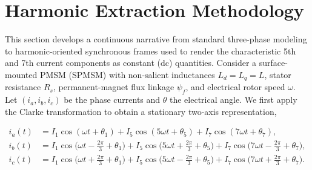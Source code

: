 \graphicspath{{./Chapters/CH5/Pictures/}}
\let\cleardoublepage\clearpage
\newcommand{\dfeq}[1]{\;\overset{\text{def}}{=}\;\label{eq:#1}}


\section{Harmonic Extraction Methodology}

This section develops a continuous narrative from standard three-phase modeling to harmonic-oriented synchronous frames used to render the characteristic 5th and 7th current components as constant (dc) quantities. Consider a surface-mounted PMSM (SPMSM) with non-salient inductances $L_d=L_q=L$, stator resistance $R_s$, permanent-magnet flux linkage $\psi_f$, and electrical rotor speed $\omega$. Let $(i_a,i_b,i_c)$ be the phase currents and $\theta$ the electrical angle. We first apply the Clarke transformation to obtain a stationary two-axis representation,

\begin{align}
i_a(t) &= I_1 \cos(\omega t+\theta_1) + I_5 \cos(5\omega t+\theta_5) + I_7 \cos(7\omega t+\theta_7), \label{eq:abc-a}\\
i_b(t) &= I_1 \cos\!\Big(\omega t-\tfrac{2\pi}{3}+\theta_1\Big)
        + I_5 \cos\!\Big(5\omega t+\tfrac{2\pi}{3}+\theta_5\Big)
        + I_7 \cos\!\Big(7\omega t-\tfrac{2\pi}{3}+\theta_7\Big), \label{eq:abc-b}\\
i_c(t) &= I_1 \cos\!\Big(\omega t+\tfrac{2\pi}{3}+\theta_1\Big)
        + I_5 \cos\!\Big(5\omega t-\tfrac{2\pi}{3}+\theta_5\Big)
        + I_7 \cos\!\Big(7\omega t+\tfrac{2\pi}{3}+\theta_7\Big). \label{eq:abc-c}
\end{align}

